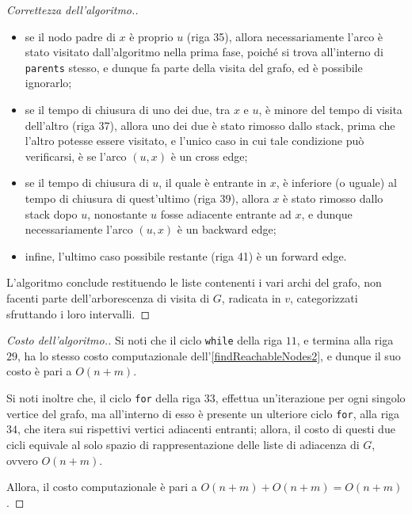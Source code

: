 \documentclass[a4paper, 12pt]{report}
\begin{document}
\begin{proof}[Correttezza dell'algoritmo.]
        \begin{itemize}
            \item se il nodo padre di $x$ è proprio $u$ (riga 35), allora necessariamente l'arco è stato visitato dall'algoritmo nella prima fase, poiché si trova all'interno di \texttt{parents} stesso, e dunque fa parte della visita del grafo, ed è possibile ignorarlo;
            \item se il tempo di chiusura di uno dei due, tra $x$ e $u$, è minore del tempo di visita dell'altro (riga 37), allora uno dei due è stato rimosso dallo stack, prima che l'altro potesse essere visitato, e l'unico caso in cui tale condizione può verificarsi, è se l'arco $(u, x)$ è un cross edge;
            \item se il tempo di chiusura di $u$, il quale è entrante in $x$, è inferiore (o uguale) al tempo di chiusura di quest'ultimo (riga 39), allora $x$ è stato rimosso dallo stack dopo $u$, nonostante $u$ fosse adiacente entrante ad $x$, e dunque necessariamente l'arco $(u, x)$ è un backward edge;
            \item infine, l'ultimo caso possibile restante (riga 41) è un forward edge.
        \end{itemize}

        L'algoritmo conclude restituendo le liste contenenti i vari archi del grafo, non facenti parte dell'arborescenza di visita di $G$, radicata in $v$, categorizzati sfruttando i loro intervalli.
    \end{proof}

    \begin{proof}[Costo dell'algoritmo.]
        Si noti che il ciclo \texttt{while} della riga $11$, e termina alla riga $29$, ha lo stesso costo computazionale dell'\cref{findReachableNodes2}, e dunque il suo costo è pari a $O(n + m)$.

        Si noti inoltre che, il ciclo \texttt{for} della riga $33$, effettua un'iterazione per ogni singolo vertice del grafo, ma all'interno di esso è presente un ulteriore ciclo \texttt{for}, alla riga $34$, che itera sui rispettivi vertici adiacenti entranti; allora, il costo di questi due cicli equivale al solo spazio di rappresentazione delle liste di adiacenza di $G$, ovvero $O(n + m)$.

        Allora, il costo computazionale è pari a $O(n + m) + O(n + m) = O(n + m)$.
    \end{proof}
\end{document}
